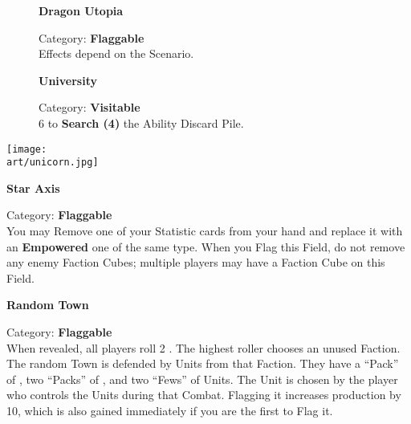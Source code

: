 \begin{figure}[H]
  \begin{minipage}[t]{0.47\textwidth}
    \vspace{0pt}
    \centering
    \textbf{Dragon Utopia}\par
    \caption{\small Category: \textbf{Flaggable}\\Effects depend on the Scenario.}
  \end{minipage}\hfill
  \begin{minipage}[t]{0.47\textwidth}
    \vspace{0pt}
    \centering
    \textbf{University}\par
    \caption{\small Category: \textbf{Visitable}\\
       6  to \textbf{Search (4)} the Ability Discard Pile.}
  \end{minipage}
\end{figure}

\begin{multicols*}{2}

{\centering\phantom{Star Axis}\par}
\texttt{[image: \\art/unicorn.jpg]}

\columnbreak

{\centering\textbf{Star Axis}\par}
{\small Category: \textbf{Flaggable}\\
  You may Remove one of your Statistic cards from your hand and replace it with an \textbf{Empowered} one of the same type.
  When you Flag this Field, do not remove any enemy Faction Cubes; multiple players may have a Faction Cube on this Field.
}

\bigskip

{\centering\textbf{\hypertarget{Random Town}{Random Town}}\par}
{\small Category: \textbf{Flaggable}\\
  When revealed, all players roll 2 .
  The highest roller chooses an unused Faction.
  The random Town is defended by Units from that Faction.
  They have a ``Pack'' of , two ``Packs'' of , and two ``Fews'' of  Units.
  The  Unit is chosen by the player who controls the Units during that Combat.
  Flagging it increases  production by 10, which is also gained immediately if you are the first to Flag it.
}

\end{multicols*}
